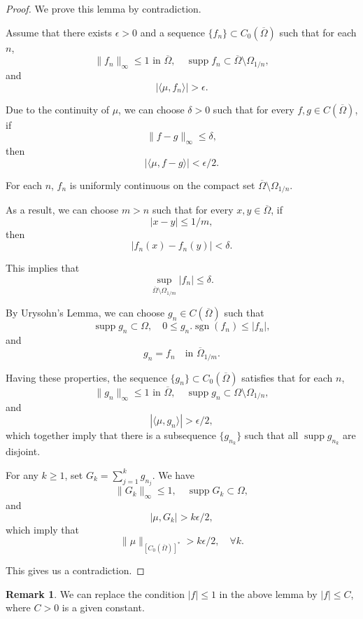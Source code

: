 \documentclass[a4paper, 11pt]{report}
\theoremstyle{definition}\newtheorem*{rmk}{Remark}
\DeclareMathOperator{\sgn}{sgn}
\DeclareMathOperator{\supp}{supp}
\begin{document}
\begin{proof}
We prove this lemma by contradiction.

Assume that there exists $\epsilon > 0$ and a sequence $\{f_n\}\subset C_0(\overline{\Omega})$ such that for each $n$,
\[
\| f_n \|_{\infty} \le 1 \text{ in } \overline{\Omega},\quad\supp f_n \subset \overline{\Omega}\setminus \Omega_{1/n},
\]
and
\[
|\langle \mu ,f_n \rangle |> \epsilon.
\]

Due to the continuity of $\mu$, we can choose $\delta > 0$ such that for every $f, g \in C(\overline{\Omega})$, if 
\[
\| f - g \|_{\infty} \le \delta , 
\] 
then 
\[
|\langle \mu, f -g \rangle |< \epsilon / 2 .
\]

For each $n$, $f_n$ is uniformly continuous on the compact set $\overline{\Omega}\setminus \Omega_{1/n}$.

As a result, we can choose $m > n$ such that for every $x, y \in \overline{\Omega}$, if
\[
|x - y| \le 1/m,
\]
then
\[
|f_n(x) - f_n(y)| < \delta .
\]

This implies that
\[
\sup_{\overline{\Omega}\setminus \Omega_{1/m}} |f_n| \le \delta .
\]

By Urysohn's Lemma, we can choose $g_n \in C(\overline{\Omega})$ such that
\[
\supp g_n \subset \Omega,\quad 0 \le g_n.\sgn (f_n) \le |f_n|,
\]
and
\[
g_n = f_n \quad\text{in }\overline{\Omega}_{1/m}.
\]

Having these properties, the sequence $\{g_n\} \subset C_0(\overline{\Omega})$ satisfies that for each $n$,
\[
\| g_n\|_{\infty} \le 1 \text{ in } \overline{\Omega},\quad\supp g_n \subset \Omega\setminus \Omega_{1/n} ,
\]
and
\[
|\langle \mu, g_n\rangle | > \epsilon / 2 ,
\]
which together imply that there is a subsequence $\{g_{n_k}\}$ such that all $\supp g_{n_k}$ are disjoint.

For any $k \ge 1$, set $G_k = \sum^{k}_{j=1} g_{n_j}$. We have 
\[
\| G_k \|_{\infty} \le 1,\quad \supp G_k \subset \Omega,
\]
and
\[
|\mu, G_k| > k\epsilon / 2,
\]
which imply that
\[
\| \mu \|_{[C_0(\overline{\Omega})]^*} > k\epsilon / 2,\quad \forall k.
\]

This gives us a contradiction.
\end{proof}

\begin{rmk}
We can replace the condition $|f| \le 1$ in the above lemma by $|f| \le C$, where $C > 0$ is a given constant.
\end{rmk}
\end{document}
